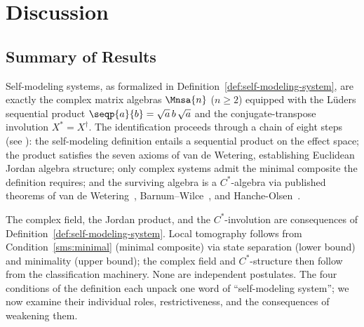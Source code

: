 
\section{Discussion}\label{sec:discussion}

\subsection{Summary of Results}\label{subsec:summary}

Self-modeling systems, as formalized in
Definition~\ref{def:self-modeling-system}, are exactly the complex
matrix algebras $\Mnsa{n}$ ($n \geq 2$) equipped with the L\"uders
sequential product
$\seqp{a}{b} = \sqrt{a}\, b\, \sqrt{a}$ and the conjugate-transpose
involution $X^{*} = X^{\dagger}$.  The identification proceeds
through a chain of eight steps (see ): the
self-modeling definition entails a sequential product on the
effect space; the product satisfies the seven axioms of van de
Wetering, establishing Euclidean Jordan algebra structure; only
complex systems admit the minimal composite the definition
requires; and the surviving algebra is a $C^{*}$-algebra via
published theorems of van de
Wetering~\cite{vandeWetering2019b},
Barnum--Wilce~\cite{BarnumWilce2014}, and
Hanche-Olsen~\cite{HancheOlsen1985}.

The complex field, the Jordan product, and the $C^{*}$-involution are
consequences of Definition~\ref{def:self-modeling-system}.  Local
tomography follows from Condition~\ref{sms:minimal} (minimal
composite) via state separation (lower bound) and minimality (upper
bound); the complex field and $C^{*}$-structure then follow from the
classification machinery.  None are independent postulates.
The four conditions of the definition each unpack one word of
``self-modeling system''; we now examine their individual roles,
restrictiveness, and the consequences of weakening them.

